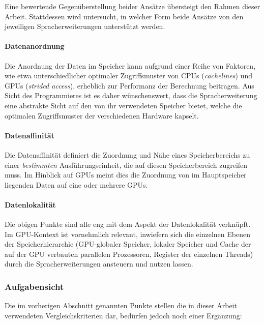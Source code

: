 Eine bewertende Gegenüberstellung beider Ansätze übersteigt den Rahmen dieser
Arbeit. Stattdessen wird untersucht, in welcher Form beide Ansätze von den
jeweiligen Spracherweiterungen unterstützt werden.

\paragraph{Datenanordnung}

Die Anordnung der Daten im Speicher kann aufgrund einer Reihe von Faktoren, wie
etwa unterschiedlicher optimaler Zugriffsmuster von CPUs (\textit{cachelines})
und GPUs (\textit{strided access}), erheblich zur Performanz der Berechnung
beitragen. Aus Sicht des Programmieres ist es daher wünschenswert, dass die
Spracherweiterung eine abstrakte Sicht auf den von ihr verwendeten Speicher
bietet, welche die optimalen Zugriffsmuster der verschiedenen Hardware kapselt.

\paragraph{Datenaffinität}

Die Datenaffinität definiert die Zuordnung und Nähe eines Speicherbereichs zu
einer \textit{bestimmten} Ausführungseinheit, die auf diesen Speicherbereich
zugreifen muss. Im Hinblick auf GPUs meint dies die Zuordnung von im
Hauptspeicher liegenden Daten auf eine oder mehrere GPUs.

\paragraph{Datenlokalität}

Die obigen Punkte sind alle eng mit dem Aspekt der Datenlokalität verknüpft.
Im GPU-Kontext ist vornehmlich relevant, inwiefern sich die einzelnen
Ebenen der Speicherhierarchie (GPU-globaler Speicher, lokaler Speicher und Cache
der auf der GPU verbauten parallelen Prozessoren, Register der einzelnen
Threads) durch die Spracherweiterungen ansteuern und nutzen lassen.

\subsubsection{Aufgabensicht}
\label{vergleich:anforderungen:aufgabensicht}

Die im vorherigen Abschnitt genannten Punkte stellen die in dieser Arbeit
verwendeten Vergleichskriterien dar, bedürfen jedoch noch einer Ergänzung:

